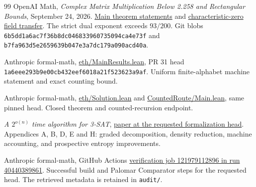 \begin{thebibliography}{99}
OpenAI Math, \emph{Complex Matrix Multiplication Below 2.258 and
Rectangular Bounds}, September 24, 2026.
\href{https://github.com/openai/math/blob/7ef5c0cc5ca4b0e072b7a050fca09ab24bc6fa3a/preprints/Complex-Matrix-Multiplication-Below-2.258-and-Rectangular-Bounds-September-24-2026/build/introduction.tex}{Main theorem statements}
and
\href{https://github.com/openai/math/blob/7ef5c0cc5ca4b0e072b7a050fca09ab24bc6fa3a/preprints/Complex-Matrix-Multiplication-Below-2.258-and-Rectangular-Bounds-September-24-2026/build/rectangular/08-comparison.tex}{characteristic-zero field transfer}.
The strict dual exponent exceeds $93/200$.
Git blobs \texttt{6b5dd1a6ac7f36b8dc046833960735094ca4e73f}
and \texttt{b7fa963d5e2659639b047e3a7dc179a090acd40a}.

Anthropic formal-math, \href{https://github.com/anthropics/formal-math/blob/1a6eee293b9e00cb432eef6018a21f523623a9af/eth/MainResults.lean}{eth/MainResults.lean},
PR 31 head \texttt{1a6eee293b9e00cb432eef6018a21f523623a9af}.
Uniform finite-alphabet machine statement and exact counting bound.

Anthropic formal-math,
\href{https://github.com/anthropics/formal-math/blob/1a6eee293b9e00cb432eef6018a21f523623a9af/eth/Solution.lean}{eth/Solution.lean}
and
\href{https://github.com/anthropics/formal-math/blob/1a6eee293b9e00cb432eef6018a21f523623a9af/eth/proof/maintheorem/CountedRoute/Main.lean}{CountedRoute/Main.lean},
same pinned head. Closed theorem and counted-recursion endpoint.

\emph{A $2^{o(n)}$ time algorithm for 3-SAT},
\href{https://github.com/anthropics/formal-math/blob/1a6eee293b9e00cb432eef6018a21f523623a9af/eth/paper.pdf}{paper at the requested formalization head}.
Appendices A, B, D, E and H: graded decomposition, density reduction,
machine accounting, and prospective entropy improvements.

Anthropic formal-math, GitHub Actions
\href{https://github.com/anthropics/formal-math/actions/runs/40440389861/job/121979112896}{verification job 121979112896 in run 40440389861}.
Successful build and Palomar Comparator steps for the requested head.
The retrieved metadata is retained in \texttt{audit/}.

\end{thebibliography}
